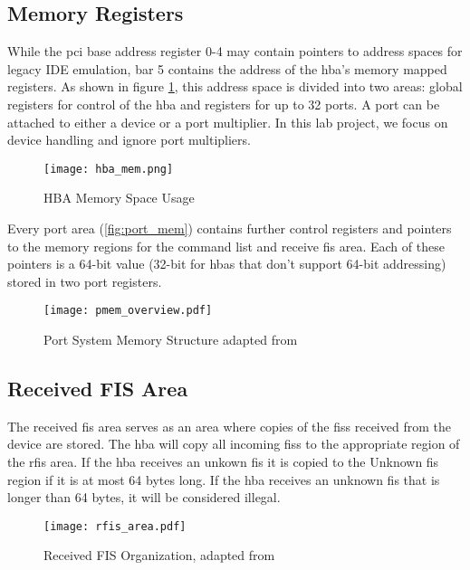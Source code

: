\subsection{Memory Registers}

While the \acs{pci} base address register 0-4 may contain pointers to address
spaces for legacy IDE emulation, \ac{bar} 5 contains the address of the
\ac{hba}'s memory mapped registers. As shown in figure \ref{fig:hba_mem}, this
address space is divided into two areas: global registers for control of the
\ac{hba} and registers for up to 32 ports. A port can be attached to either a
device or a port multiplier. In this lab project, we focus on device handling
and ignore port multipliers.

\begin{figure}[ht]
\centering
\texttt{[image: hba\_mem.png]}
\caption{HBA Memory Space Usage \cite[p.~33]{ahci_1.3}}
\label{fig:hba_mem}
\end{figure}

Every port area (\autoref{fig:port_mem}) contains further control registers and
pointers to the memory regions for the command list and receive \ac{fis} area.
Each of these pointers is a 64-bit value (32-bit for \acp{hba} that don't
support 64-bit addressing) stored in two port registers.

\begin{figure}[ht]
\centering
\texttt{[image: pmem\_overview.pdf]}
\caption{Port System Memory Structure adapted from \cite[p.~34]{ahci_1.3}}
\label{fig:port_mem}
\end{figure}

\subsection{Received FIS Area}

The received \ac{fis} area serves as an area where copies of the \acp{fis}
received from the device are stored. The \ac{hba} will copy all incoming
\acp{fis} to the appropriate region of the \ac{rfis} area. If the \ac{hba}
receives an unkown \ac{fis} it is copied to the Unknown \ac{fis} region if it
is at most 64 bytes long. If the \ac{hba} receives an unknown \ac{fis} that is
longer than 64 bytes, it will be considered illegal.

\begin{figure}[ht]
\centering
\texttt{[image: rfis\_area.pdf]}
\caption{Received FIS Organization, adapted from \cite[p.~35]{ahci_1.3}}
\label{fig:rfis_mem}
\end{figure}


